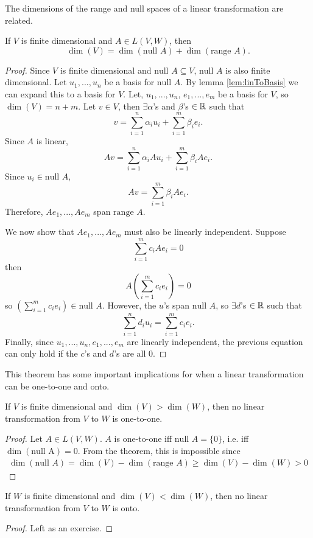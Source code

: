 The dimensions of the range and null spaces of
a linear transformation are related.
\begin{theorem}
  If $V$ is finite dimensional and $A \in L(V,W)$, then 
  \[ \dim(V) = \dim(\text{null } A) + \dim(\text{range } A). \]
\end{theorem}
\begin{proof}
  Since $V$ is finite dimensional and $\text{null } A \subseteq V$,
  $\text{null } A$ is also finite dimensional. Let $u_1, ..., u_n$ be
  a basis for $\text{null } A$. By lemma \ref{lem:linToBasis} we can
  expand this to a basis for $V$. Let, $u_1, ...,
  u_n$, $e_1, ..., e_m$ be a basis for $V$, so $\dim(V) = n + m$. 
  Let $v \in V$, then $\exists \alpha$'s and $\beta$'s $\in \mathbb{R}$ such
  that 
  \[ v = \sum_{i=1}^n \alpha_i u_i  + \sum_{i=1}^m \beta_i e_i. \]
  Since $A$ is linear, 
  \[ A v = \sum_{i=1}^n \alpha_i A u_i  + \sum_{i=1}^m \beta_i A
  e_i. \]
  Since $u_i \in \text{null } A$, 
  \[ A v =  \sum_{i=1}^m \beta_i A
  e_i. \]
  Therefore, $A e_1, ..., A e_m$ span $\text{range } A$. 
  
  We now show that $A e_1, ..., A e_m$ must also be linearly
  independent. Suppose
  \[ \sum_{i=1}^m c_i A e_i = 0 \]
  then 
  \[ A \left( \sum_{i=1}^m c_i e_i \right) = 0\]
  so $\left( \sum_{i=1}^m c_i e_i \right) \in \text{null }
  A$. However, the $u$'s span $ \text{null } A$, so $\exists d$'s $\in
  \mathbb{R}$ such that
  \[ \sum_{i=1}^n d_i u_i = \sum_{i=1}^m c_i e_i. \]
  Finally, since $u_1, ..., u_n, e_1, ..., e_m$ are linearly
  independent, the previous equation can only hold if the $c$'s and
  $d$'s are all $0$. 
\end{proof}
This theorem has some important implications for when a linear
transformation can be one-to-one and onto. 
\begin{corollary}
  If $V$ is finite dimensional and $\dim(V) > \dim(W)$, then no linear
  transformation from $V$ to $W$ is one-to-one.
\end{corollary}
\begin{proof}
  Let $A \in L(V,W)$. $A$ is one-to-one iff $\text{null } A = \{0\}$,
  i.e. iff $\dim(\text{null A}) = 0$. From the theorem, this is
  impossible since
  \begin{align*}
    \dim(\text{null } A) = \dim(V) - \dim(\text{range } A) \geq
    \dim(V) - \dim(W) > 0 
  \end{align*}
\end{proof}
\begin{corollary}
  If $W$ is finite dimensional and $\dim(V) < \dim(W)$, then no linear
  transformation from $V$ to $W$ is onto.
\end{corollary}
\begin{proof}
  Left as an exercise. 
\end{proof}


